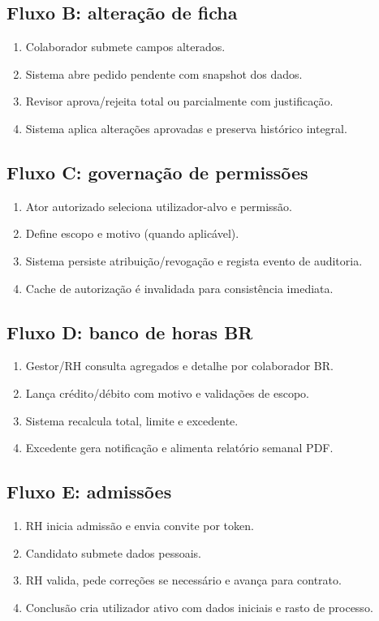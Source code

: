 \documentclass[11pt,a4paper,twoside]{article}
\begin{document}
\subsection{Fluxo B: alteração de ficha}
\begin{enumerate}
  \item Colaborador submete campos alterados.
  \item Sistema abre pedido pendente com snapshot dos dados.
  \item Revisor aprova/rejeita total ou parcialmente com justificação.
  \item Sistema aplica alterações aprovadas e preserva histórico integral.
\end{enumerate}

\subsection{Fluxo C: governação de permissões}
\begin{enumerate}
  \item Ator autorizado seleciona utilizador-alvo e permissão.
  \item Define escopo e motivo (quando aplicável).
  \item Sistema persiste atribuição/revogação e regista evento de auditoria.
  \item Cache de autorização é invalidada para consistência imediata.
\end{enumerate}

\subsection{Fluxo D: banco de horas BR}
\begin{enumerate}
  \item Gestor/RH consulta agregados e detalhe por colaborador BR.
  \item Lança crédito/débito com motivo e validações de escopo.
  \item Sistema recalcula total, limite e excedente.
  \item Excedente gera notificação e alimenta relatório semanal PDF.
\end{enumerate}

\subsection{Fluxo E: admissões}
\begin{enumerate}
  \item RH inicia admissão e envia convite por token.
  \item Candidato submete dados pessoais.
  \item RH valida, pede correções se necessário e avança para contrato.
  \item Conclusão cria utilizador ativo com dados iniciais e rasto de processo.
\end{enumerate}
\end{document}
